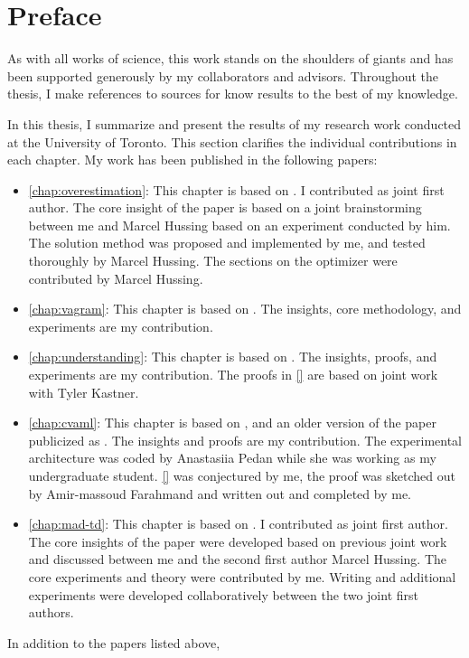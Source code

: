 \chapter*{Preface}

As with all works of science, this work stands on the shoulders of giants and has been supported generously by my collaborators and advisors.
Throughout the thesis, I make references to sources for know results to the best of my knowledge.


In this thesis, I summarize and present the results of my research work conducted at the University of Toronto.
This section clarifies the individual contributions in each chapter.
My work has been published in the following papers:

\begin{itemize}
    \item \autoref{chap:overestimation}: This chapter is based on \textcite{hussing2024dissecting}. I contributed as joint first author. The core insight of the paper is based on a joint brainstorming between me and Marcel Hussing based on an experiment conducted by him. The solution method was proposed and implemented by me, and tested thoroughly by Marcel Hussing. The sections on the optimizer were contributed by Marcel Hussing.
    \item \autoref{chap:vagram}: This chapter is based on \textcite{voelcker2022value}. The insights, core methodology, and experiments are my contribution.
    \item \autoref{chap:understanding}: This chapter is based on \textcite{voelcker2024when}. The insights, proofs, and experiments are my contribution. The proofs in \autoref{} are based on joint work with Tyler Kastner. 
    \item \autoref{chap:cvaml}: This chapter is based on \textcite{voelcker2025calibrated}, and an older version of the paper publicized as \textcite{voelcker2023lambda}. The insights and proofs are my contribution. The experimental architecture was coded by Anastasiia Pedan while she was working as my undergraduate student. \autoref{} was conjectured by me, the proof was sketched out by Amir-massoud Farahmand and written out and completed by me.
    \item \autoref{chap:mad-td}: This chapter is based on \textcite{voelcker2025mad}. I contributed as joint first author. The core insights of the paper were developed based on previous joint work \cite{hussing2024dissecting} and discussed between me and the second first author Marcel Hussing. The core experiments and theory were contributed by me. Writing  and additional experiments were developed collaboratively between the two joint first authors.
\end{itemize}

In addition to the papers listed above, 